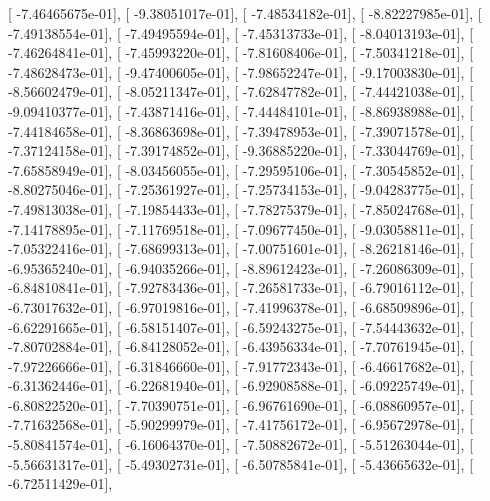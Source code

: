 \documentclass{article}
\begin{document}
       [ -7.46465675e-01],
       [ -9.38051017e-01],
       [ -7.48534182e-01],
       [ -8.82227985e-01],
       [ -7.49138554e-01],
       [ -7.49495594e-01],
       [ -7.45313733e-01],
       [ -8.04013193e-01],
       [ -7.46264841e-01],
       [ -7.45993220e-01],
       [ -7.81608406e-01],
       [ -7.50341218e-01],
       [ -7.48628473e-01],
       [ -9.47400605e-01],
       [ -7.98652247e-01],
       [ -9.17003830e-01],
       [ -8.56602479e-01],
       [ -8.05211347e-01],
       [ -7.62847782e-01],
       [ -7.44421038e-01],
       [ -9.09410377e-01],
       [ -7.43871416e-01],
       [ -7.44484101e-01],
       [ -8.86938988e-01],
       [ -7.44184658e-01],
       [ -8.36863698e-01],
       [ -7.39478953e-01],
       [ -7.39071578e-01],
       [ -7.37124158e-01],
       [ -7.39174852e-01],
       [ -9.36885220e-01],
       [ -7.33044769e-01],
       [ -7.65858949e-01],
       [ -8.03456055e-01],
       [ -7.29595106e-01],
       [ -7.30545852e-01],
       [ -8.80275046e-01],
       [ -7.25361927e-01],
       [ -7.25734153e-01],
       [ -9.04283775e-01],
       [ -7.49813038e-01],
       [ -7.19854433e-01],
       [ -7.78275379e-01],
       [ -7.85024768e-01],
       [ -7.14178895e-01],
       [ -7.11769518e-01],
       [ -7.09677450e-01],
       [ -9.03058811e-01],
       [ -7.05322416e-01],
       [ -7.68699313e-01],
       [ -7.00751601e-01],
       [ -8.26218146e-01],
       [ -6.95365240e-01],
       [ -6.94035266e-01],
       [ -8.89612423e-01],
       [ -7.26086309e-01],
       [ -6.84810841e-01],
       [ -7.92783436e-01],
       [ -7.26581733e-01],
       [ -6.79016112e-01],
       [ -6.73017632e-01],
       [ -6.97019816e-01],
       [ -7.41996378e-01],
       [ -6.68509896e-01],
       [ -6.62291665e-01],
       [ -6.58151407e-01],
       [ -6.59243275e-01],
       [ -7.54443632e-01],
       [ -7.80702884e-01],
       [ -6.84128052e-01],
       [ -6.43956334e-01],
       [ -7.70761945e-01],
       [ -7.97226666e-01],
       [ -6.31846660e-01],
       [ -7.91772343e-01],
       [ -6.46617682e-01],
       [ -6.31362446e-01],
       [ -6.22681940e-01],
       [ -6.92908588e-01],
       [ -6.09225749e-01],
       [ -6.80822520e-01],
       [ -7.70390751e-01],
       [ -6.96761690e-01],
       [ -6.08860957e-01],
       [ -7.71632568e-01],
       [ -5.90299979e-01],
       [ -7.41756172e-01],
       [ -6.95672978e-01],
       [ -5.80841574e-01],
       [ -6.16064370e-01],
       [ -7.50882672e-01],
       [ -5.51263044e-01],
       [ -5.56631317e-01],
       [ -5.49302731e-01],
       [ -6.50785841e-01],
       [ -5.43665632e-01],
       [ -6.72511429e-01],
\end{document}
